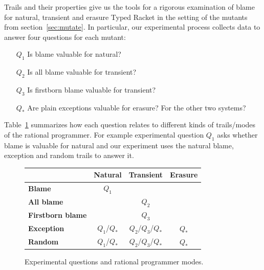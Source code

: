 Trails and their properties give us the tools for a rigorous examination
of blame for natural, transient and erasure Typed Racket in the setting of the 
mutants from section~\ref{sec:mutate}. In particular, our experimental
process collects data to answer four questions for each mutant:
\begin{itemize}
\item[$Q_1$] Is blame valuable for natural?

\item[$Q_2$] Is all blame valuable for transient?

\item[$Q_3$] Is firstborn blame valuable for transient?

\item[$Q_*$] Are plain exceptions valuable for
  erasure? For the other two systems? 
\end{itemize}

Table~\ref{fig:experiment-outline} summarizes how each question relates to
different kinds of trails/modes of the rational programmer. For example experimental
question $Q_1$ asks whether blame is valuable for natural and our experiment
uses the natural blame, exception and random trails to answer it.

\begin{figure}[ht]
\center
{\begin{tabular}{l|c|c|c}
                        & {\bf Natural}        & {\bf Transient}          & {\bf Erasure} \\ \hline 
{\bf Blame}             &       $Q_1$          &                          &               \\
{\bf All blame}         &                      &     $Q_2$                &               \\
{\bf Firstborn blame}   &                      &     $Q_3$                &               \\
{\bf Exception}         &       $Q_1$/$Q_*$    &     $Q_2$/$Q_3$/$Q_*$    &      $Q_*$    \\
{\bf Random}            &       $Q_1$/$Q_*$    &     $Q_2$/$Q_3$/$Q_*$    &      $Q_*$    \\
\end{tabular}}
  \caption{ Experimental questions and rational programmer modes.}
  \label{fig:experiment-outline}
\end{figure}

